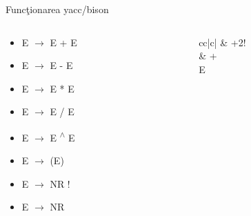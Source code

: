 \documentclass[pdf]{beamer}
\begin{document}
\begin{frame}{Funcţionarea yacc/bison}
\begin{columns}
\begin{column}{0.5\textwidth}
\begin{itemize}
	\item
	E $\rightarrow$ E + E

	\item
	E $\rightarrow$ E - E

	\item
	E $\rightarrow$ E * E

	\item
	E $\rightarrow$ E / E

	\item
	E $\rightarrow$ E \textsuperscript{$\wedge$} E

	\item
	E $\rightarrow$ (E)

	\item
	E $\rightarrow$ NR !

	\item
	E $\rightarrow$ NR

\end{itemize}
\end{column}

\begin{column}{0.3\textwidth}
\begin{tabular}{cc|c|} 
 & {\hspace{0.4cm} +2!} \\ 
 &   
 {+} \\
 {E} \\ 
\end{tabular}

\end{column}
\end{columns}
\end{frame}
\end{document}
